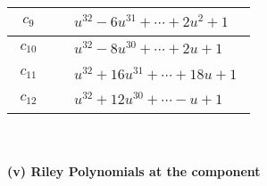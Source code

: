 \documentclass[1p]{elsarticle_modified}
\theoremstyle{definition}
\begin{document}
\begin{tabular}{m{50pt}|m{274pt}}
\hline $$\begin{aligned}c_{9}\end{aligned}$$&$\begin{aligned}
&u^{32}-6 u^{31}+\cdots+2 u^2+1
\end{aligned}$\\
\hline $$\begin{aligned}c_{10}\end{aligned}$$&$\begin{aligned}
&u^{32}-8 u^{30}+\cdots+2 u+1
\end{aligned}$\\
\hline $$\begin{aligned}c_{11}\end{aligned}$$&$\begin{aligned}
&u^{32}+16 u^{31}+\cdots+18 u+1
\end{aligned}$\\
\hline $$\begin{aligned}c_{12}\end{aligned}$$&$\begin{aligned}
&u^{32}+12 u^{30}+\cdots- u+1
\end{aligned}$\\
\hline
\end{tabular}\\~\\
\newpage\renewcommand{\arraystretch}{1}
\flushleft \textbf{(v) Riley Polynomials at the component}\newline \\
\end{document}

